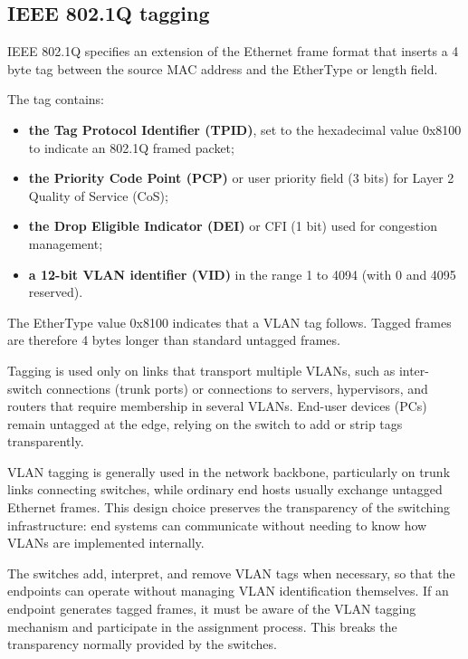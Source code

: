 \subsection{IEEE 802.1Q tagging}

IEEE 802.1Q specifies an extension of the Ethernet frame format that inserts a 4 byte tag between the source MAC address and the EtherType or length field. 

\begin{center}
\end{center}


The tag contains:

\begin{itemize}
	\item \textbf{the Tag Protocol Identifier (TPID)}, set to the hexadecimal value 0x8100 to indicate an 802.1Q framed packet;
	\item \textbf{the Priority Code Point (PCP)} or user priority field (3 bits) for Layer 2 Quality of Service (CoS);
	\item \textbf{the Drop Eligible Indicator (DEI)} or CFI (1 bit) used for congestion management;
	\item \textbf{a 12-bit VLAN identifier (VID)} in the range 1 to 4094 (with 0 and 4095 reserved).
\end{itemize}

The EtherType value 0x8100 indicates that a VLAN tag follows. Tagged frames are therefore 4 bytes longer than standard untagged frames.

\begin{center}
\end{center}

Tagging is used only on links that transport multiple VLANs, such as inter-switch connections (trunk ports) or connections to servers, hypervisors, and routers that require membership in several VLANs. End-user devices (PCs) remain untagged at the edge, relying on the switch to add or strip tags transparently.

VLAN tagging is generally used in the network backbone, particularly on trunk links connecting switches, while ordinary end hosts usually exchange untagged Ethernet frames. This design choice preserves the transparency of the switching infrastructure: end systems can communicate without needing to know how VLANs are implemented internally.

The switches add, interpret, and remove VLAN tags when necessary, so that the endpoints can operate without managing VLAN identification themselves. If an endpoint generates tagged frames, it must be aware of the VLAN tagging mechanism and participate in the assignment process. This breaks the transparency normally provided by the switches.

